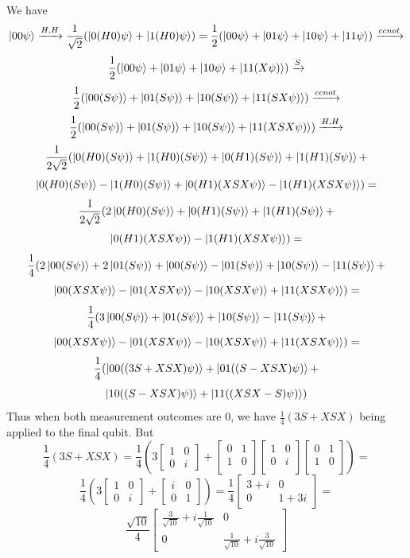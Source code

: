 We have 
\[\ket{00\psi}\xrightarrow{H,H} \frac{1}{\sqrt{2}}(\ket{0(H0)\psi} + \ket{1(H0)\psi}) =\frac{1}{2}(\ket{00\psi} +\ket{01\psi}  + \ket{10\psi}+\ket{11\psi})\xrightarrow{ccnot} \]
\[\frac{1}{2}(\ket{00\psi} +\ket{01\psi}  + \ket{10\psi}+\ket{11(X\psi)})\xrightarrow{S}\]
\[\frac{1}{2}(\ket{00(S\psi)} +\ket{01(S\psi)}  + \ket{10(S\psi)}+\ket{11(SX\psi)})\xrightarrow{ccnot}\]
\[\frac{1}{2}(\ket{00(S\psi)} +\ket{01(S\psi)}  + \ket{10(S\psi)}+\ket{11(XSX\psi)})\xrightarrow{H,H}\]
\[\frac{1}{2\sqrt{2}}(\ket{0(H0)(S\psi)}+\ket{1(H0)(S\psi)} +\ket{0(H1)(S\psi)} + \ket{1(H1)(S\psi)}  +\]\[\ket{0(H0)(S\psi)} -\ket{1(H0)(S\psi)}+\ket{0(H1)(XSX\psi)}-\ket{1(H1)(XSX\psi)}) = \]
\[\frac{1}{2\sqrt{2}}(2\ket{0(H0)(S\psi)} +\ket{0(H1)(S\psi)} + \ket{1(H1)(S\psi)} +\]\[\ket{0(H1)(XSX\psi)}-\ket{1(H1)(XSX\psi)}) = \]
\[\frac{1}{4}(2\ket{00(S\psi)} + 2\ket{01(S\psi)}+\ket{00(S\psi)}-\ket{01(S\psi)} + \ket{10(S\psi)}-\ket{11(S\psi)} +\]\[\ket{00(XSX\psi)} -\ket{01(XSX\psi)}-\ket{10(XSX\psi)} + \ket{11(XSX\psi)}) = \]
\[\frac{1}{4}(3\ket{00(S\psi)} + \ket{01(S\psi)} + \ket{10(S\psi)}-\ket{11(S\psi)} +\]\[\ket{00(XSX\psi)} -\ket{01(XSX\psi)}-\ket{10(XSX\psi)} + \ket{11(XSX\psi)}) = \]
\[\frac{1}{4}(\ket{00((3S + XSX)\psi)} + \ket{01((S-XSX)\psi)} +\]\[\ket{10((S-XSX)\psi)} + \ket{11((XSX-S)\psi)})\] Thus when both measurement outcomes are $0$, we have $\frac{1}{4}(3S + XSX)$ being applied to the final qubit.
But \[\frac{1}{4}(3S + XSX) = \frac{1}{4}\left(3\begin{bmatrix}
    1 & 0 \\
    0 & i
\end{bmatrix} + \begin{bmatrix}
    0 & 1\\
    1 & 0\\
\end{bmatrix}\begin{bmatrix}
    1 & 0\\
    0 & i\\
\end{bmatrix}\begin{bmatrix}
    0 & 1\\
    1 & 0\\
\end{bmatrix}\right) = \]
\[\frac{1}{4}\left(3\begin{bmatrix}
    1 & 0 \\
    0 & i
\end{bmatrix} + \begin{bmatrix}
    i & 0 \\
    0 & 1
\end{bmatrix}  \right) = \frac{1}{4}\begin{bmatrix}
    3+i & 0 \\
    0 & 1+3i
\end{bmatrix} = \]\[\frac{\sqrt{10}}{4}\begin{bmatrix}
    \frac{3}{\sqrt{10}}+i\frac{1}{\sqrt{10}} & 0 \\
    0 & \frac{1}{\sqrt{10}}+i\frac{3}{\sqrt{10}}
\end{bmatrix} \]
